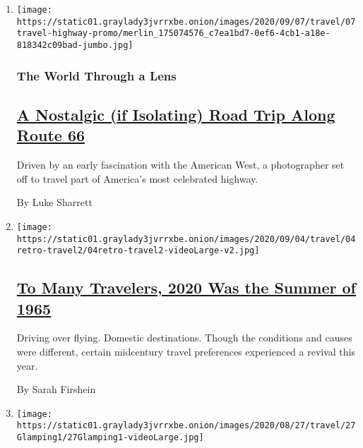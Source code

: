 \begin{enumerate}
\def\labelenumi{\arabic{enumi}.}
\item
  \texttt{[image: https://static01.graylady3jvrrxbe.onion/images/2020/09/07/travel/07travel-highway-promo/merlin\_175074576\_c7ea1bd7-0ef6-4cb1-a18e-818342c09bad-jumbo.jpg]}

  \hypertarget{the-world-through-a-lens}{%
  \subsubsection{The World Through a
  Lens}\label{the-world-through-a-lens}}

  \hypertarget{a-nostalgic-if-isolating-road-trip-along-route-66}{%
  \subsection{\texorpdfstring{\href{/2020/09/07/travel/route-66.html}{A
  Nostalgic (if Isolating) Road Trip Along Route
  66}}{A Nostalgic (if Isolating) Road Trip Along Route 66}}\label{a-nostalgic-if-isolating-road-trip-along-route-66}}

  Driven by an early fascination with the American West, a photographer
  set off to travel part of America's most celebrated highway.

  By Luke Sharrett
\item
  \texttt{[image: https://static01.graylady3jvrrxbe.onion/images/2020/09/04/travel/04retro-travel2/04retro-travel2-videoLarge-v2.jpg]}

  \hypertarget{to-many-travelers-2020-was-the-summer-of-1965}{%
  \subsection{\texorpdfstring{\href{/2020/09/04/travel/to-many-travelers-2020-was-the-summer-of-1965.html}{To
  Many Travelers, 2020 Was the Summer of
  1965}}{To Many Travelers, 2020 Was the Summer of 1965}}\label{to-many-travelers-2020-was-the-summer-of-1965}}

  Driving over flying. Domestic destinations. Though the conditions and
  causes were different, certain midcentury travel preferences
  experienced a revival this year.

  By Sarah Firshein
\item
  \texttt{[image: https://static01.graylady3jvrrxbe.onion/images/2020/08/27/travel/27Glamping1/27Glamping1-videoLarge.jpg]}

  \hypertarget{glamping-for-first-timers}{%
}
\end{enumerate}
